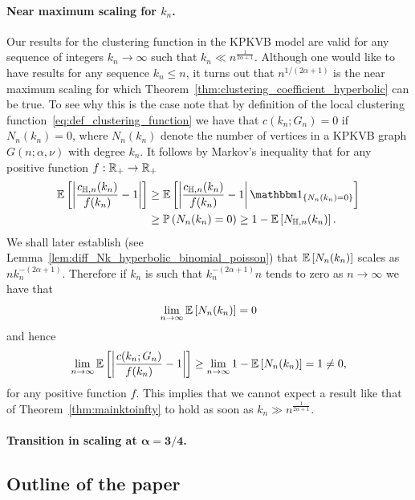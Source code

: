 \paragraph{Near maximum scaling for $k_n$.}
Our results for the clustering function in the KPKVB model are valid for any sequence of integers $k_n \to \infty$ such that $k_n \ll n^{\frac{1}{2\alpha + 1}}$. Although one would like to have results for any sequence $k_n \le n$, it turns out that $n^{1/(2\alpha + 1)}$ is the near maximum scaling for which Theorem~\ref{thm:clustering_coefficient_hyperbolic} can be true. To see why this is the case note that by definition of the local clustering function~\eqref{eq:def_clustering_function} we have that $c(k_n; G_n) = 0$ if $N_{n}(k_n) = 0$, where $N_n(k_n)$ denote the number of vertices in a KPKVB graph $G(n; \alpha, \nu)$ with degree $k_n$. It follows by Markov's inequality that for any positive function $f : {\mathbb R}_+ \to {\ensuremath{\mathbb R}}_+$
\begin{align*}
	\Exp{\left|\frac{c_{\H,n}(k_n)}{f(k_n)} - 1\right|} 
	&\ge \Exp{\left|\frac{c_{\H,n}(k_n)}{f(k_n)} - 1\right|\ind{N_n(k_n) = 0}}\\ 
	&\ge \Prob{N_{n}(k_n) = 0} \ge 1 - \Exp{N_{\H,n}(k_n)}.
\end{align*}
We shall later establish (see Lemma~\ref{lem:diff_Nk_hyperbolic_binomial_poisson}) that $\mathbb{E}\left[N_n(k_n)\right]$ scales as $n k_n^{-(2\alpha + 1)}$. Therefore if $k_n$ is such that $k_n^{-(2\alpha + 1)} n$ tends to zero as $n \to \infty$ we have that 
\[
	\lim_{n \to \infty} \mathbb{E}\left[N_{n}(k_n)\right] = 0
\]
and hence
\[
	\lim_{n \to \infty} \mathbb{E}\left[\left|\frac{c(k_n; G_n)}{f(k_n)} - 1\right|\right] 
	\ge \lim_{n \to \infty} 1 - \mathbb{E}\left[N_{n}(k_n)\right] = 1 \ne 0,
\]
for any positive function $f$. This implies that we cannot expect a result like that of Theorem~\ref{thm:mainktoinfty} to hold as soon as $k_n \gg n^{\frac{1}{2\alpha + 1}}$.

\paragraph{Transition in scaling at $\bm{\alpha = 3/4}$.}


\subsection{Outline of the paper}


